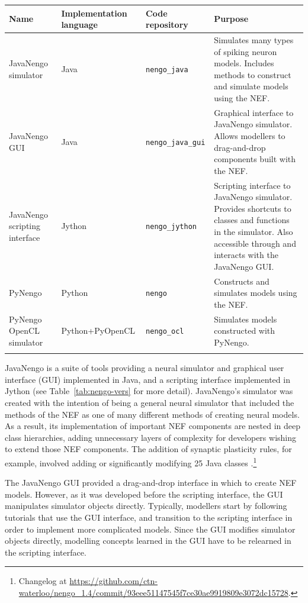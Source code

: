 \documentclass{frontiersSCNS}
\begin{document}
\begin{table}[!t]
{\begin{tabular}{p{2.6cm} p{2.7cm} l p{7cm}} \toprule
\textbf{Name} & \textbf{Implementation language}
  & \textbf{Code repository} & \textbf{Purpose} \\\midrule
JavaNengo simulator & Java & \texttt{nengo\_java}
  & Simulates many types of spiking neuron models.
  Includes methods to construct and simulate models using the NEF. \\
JavaNengo GUI & Java & \texttt{nengo\_java\_gui}
  & Graphical interface to JavaNengo simulator.
  Allows modellers to drag-and-drop components built with the NEF. \\
JavaNengo scripting interface & Jython & \texttt{nengo\_jython}
  & Scripting interface to JavaNengo simulator.
  Provides shortcuts to classes and functions in the simulator.
  Also accessible through and interacts with the JavaNengo GUI. \\
PyNengo & Python & \texttt{nengo}
  & Constructs and simulates models using the NEF. \\
PyNengo OpenCL simulator & Python+PyOpenCL
  & \texttt{nengo\_ocl}
  & Simulates models constructed with PyNengo. \\\botrule
\end{tabular}}{}
\end{table}

JavaNengo is a suite of tools providing
a neural simulator and graphical user interface (GUI)
implemented in Java,
and a scripting interface implemented in Jython
(see Table~\ref{tab:nengo-vers} for more detail).
JavaNengo's simulator was created
with the intention of being a general
neural simulator that included
the methods of the NEF
as one of many different
methods of creating neural models.
As a result, its implementation
of important NEF components
are nested in deep class hierarchies,
adding unnecessary layers of complexity
for developers wishing
to extend those NEF components.
The addition of synaptic plasticity rules,
for example, involved adding or significantly modifying
25 Java classes \cite{TODO}.\footnote{Changelog at
  \url{https://github.com/ctn-waterloo/nengo_1.4/commit/93eee51147545f7ce30ae9919809e3072dc15728}.}

The JavaNengo GUI provided
a drag-and-drop interface in which to create NEF models.
However, as it was developed
before the scripting interface,
the GUI manipulates simulator objects directly.
Typically, modellers start by following
tutorials that use the GUI interface,
and transition to the scripting interface
in order to implement more complicated models.
Since the GUI modifies simulator objects directly,
modelling concepts learned in the GUI
have to be relearned in the scripting interface.
\end{document}
